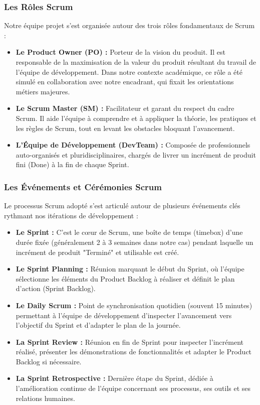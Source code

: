 \subsubsection{Les Rôles Scrum}
Notre équipe projet s'est organisée autour des trois rôles fondamentaux de Scrum :
\begin{itemize}
    \item \textbf{Le Product Owner (PO) :} Porteur de la vision du produit. Il est responsable de la maximisation de la valeur du produit résultant du travail de l'équipe de développement. Dans notre contexte académique, ce rôle a été simulé en collaboration avec notre encadrant, qui fixait les orientations métiers majeures.
    \item \textbf{Le Scrum Master (SM) :} Facilitateur et garant du respect du cadre Scrum. Il aide l'équipe à comprendre et à appliquer la théorie, les pratiques et les règles de Scrum, tout en levant les obstacles bloquant l'avancement.
    \item \textbf{L'Équipe de Développement (DevTeam) :} Composée de professionnels auto-organisés et pluridisciplinaires, chargés de livrer un incrément de produit fini (Done) à la fin de chaque Sprint.
\end{itemize}

\subsubsection{Les Événements et Cérémonies Scrum}
Le processus Scrum adopté s'est articulé autour de plusieurs événements clés rythmant nos itérations de développement :
\begin{itemize}
    \item \textbf{Le Sprint :} C'est le cœur de Scrum, une boîte de temps (timebox) d'une durée fixée (généralement 2 à 3 semaines dans notre cas) pendant laquelle un incrément de produit "Terminé" et utilisable est créé.
    \item \textbf{Le Sprint Planning :} Réunion marquant le début du Sprint, où l'équipe sélectionne les éléments du Product Backlog à réaliser et définit le plan d'action (Sprint Backlog).
    \item \textbf{Le Daily Scrum :} Point de synchronisation quotidien (souvent 15 minutes) permettant à l'équipe de développement d'inspecter l'avancement vers l'objectif du Sprint et d'adapter le plan de la journée.
    \item \textbf{La Sprint Review :} Réunion en fin de Sprint pour inspecter l'incrément réalisé, présenter les démonstrations de fonctionnalités et adapter le Product Backlog si nécessaire.
    \item \textbf{La Sprint Retrospective :} Dernière étape du Sprint, dédiée à l'amélioration continue de l'équipe concernant ses processus, ses outils et ses relations humaines.
\end{itemize}

